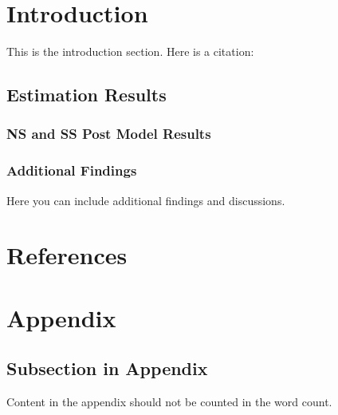 \documentclass{article}%
\begin{document}
%
\newpage%
\listoffigures%
\newpage%
\listoftables%
\newpage%
%
\pagestyle{mainmatter}%
\section{Introduction}%
\label{sec:Introduction}%
This is the introduction section. Here is a citation: %
\cite{example_reference}

%
\subsection{Estimation Results}%
\label{subsec:EstimationResults}%
\subsubsection{NS and SS Post Model Results}%
\label{ssubsec:NSandSSPostModelResults}%


%
\newpage%
\subsubsection{Additional Findings}%
\label{ssubsec:AdditionalFindings}%
Here you can include additional findings and discussions.

%
\newpage%
\section{References}%
\label{sec:References}%
\printbibliography

%
\newpage%
\section{Appendix}%
\label{sec:Appendix}%
\subsection{Subsection in Appendix}%
\label{subsec:SubsectioninAppendix}%
Content in the appendix should not be counted in the word count.

%
\end{document}
